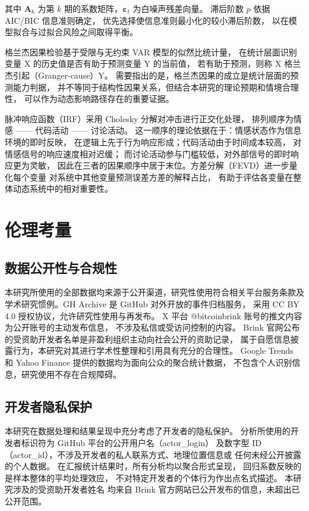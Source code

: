 \documentclass[
    type = master, %
    degree = professional,        %
    decl-page,  %
    twoside,                %
    fontset = fandol %
  ]{njuthesis}
\begin{document}
其中 $\mathbf{A}_k$ 为第 $k$ 期的系数矩阵，$\boldsymbol{\varepsilon}_t$ 为白噪声残差向量。
滞后阶数 $p$ 依据 AIC/BIC 信息准则确定，
优先选择使信息准则最小化的较小滞后阶数，
以在模型拟合与过拟合风险之间取得平衡。

格兰杰因果检验基于受限与无约束 VAR 模型的似然比统计量，
在统计层面识别变量 X 的历史值是否有助于预测变量 Y 的当前值，
若有助于预测，则称 X 格兰杰引起（Granger-cause）Y。
需要指出的是，格兰杰因果的成立是统计层面的预测能力判据，
并不等同于结构性因果关系，但结合本研究的理论预期和情境合理性，
可以作为动态影响路径存在的重要证据。

脉冲响应函数（IRF）采用 Cholesky 分解对冲击进行正交化处理，
排列顺序为情感 —— 代码活动 —— 讨论活动。
这一顺序的理论依据在于：情感状态作为信息环境的即时反映，
在逻辑上先于行为响应形成；代码活动由于时间成本较高，
对情感信号的响应速度相对迟缓；
而讨论活动参与门槛较低，对外部信号的即时响应更为灵敏，
因此在三者的因果顺序中居于末位。方差分解（FEVD）进一步量化每个变量
对系统中其他变量预测误差方差的解释占比，
有助于评估各变量在整体动态系统中的相对重要性。

\section{伦理考量}

\subsection{数据公开性与合规性}

本研究所使用的全部数据均来源于公开渠道，研究性使用符合相关平台服务条款及
学术研究惯例。GH Archive 是 GitHub 对外开放的事件归档服务，
采用 CC BY 4.0 授权协议，允许研究性使用与再发布。
X 平台 @bitcoinbrink 账号的推文内容为公开账号的主动发布信息，
不涉及私信或受访问控制的内容。
Brink 官网公布的受资助开发者名单是非盈利组织主动向社会公开的资助记录，
属于自愿信息披露行为，本研究对其进行学术性整理和引用具有充分的合理性。
Google Trends 和 Yahoo Finance 提供的数据均为面向公众的聚合统计数据，
不包含个人识别信息，研究使用不存在合规障碍。

\subsection{开发者隐私保护}

本研究在数据处理和结果呈现中充分考虑了开发者的隐私保护。
分析所使用的开发者标识符为 GitHub 平台的公开用户名（actor\_login）
及数字型 ID（actor\_id），不涉及开发者的私人联系方式、地理位置信息或
任何未经公开披露的个人数据。
在汇报统计结果时，所有分析均以聚合形式呈现，
回归系数反映的是样本整体的平均处理效应，
不对特定开发者的个体行为作出点名式描述。
本研究涉及的受资助开发者姓名
均来自 Brink 官方网站已公开发布的信息，未超出已公开范围。
\end{document}
